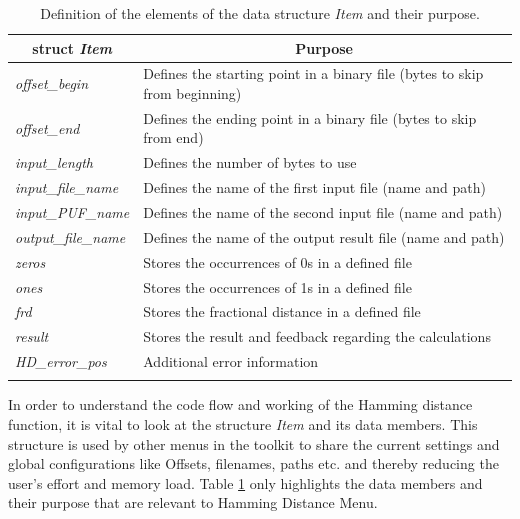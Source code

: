 \begin{table}[t]
	\begin{center}
		\begin{tabular}{ll}
			\toprule
			\multicolumn{1}{c}{\textbf{struct \emph{Item}}} & \multicolumn{1}{c}{\textbf{Purpose}}\\
			\midrule
			\hline

			\emph{offset\_begin} & Defines the starting point in a binary file (bytes to skip from beginning)\\

			\emph{offset\_end} & Defines the ending point in a binary file (bytes to skip from end)\\

			\emph{input\_length} & Defines the number of bytes to use \\

			\emph{input\_file\_name} & Defines the name of the first input file (name and path)\\

			\emph{input\_PUF\_name} & Defines the name of the second input file (name and path)\\

			\emph{output\_file\_name} & Defines the name of the output result file (name and path)\\

			\emph{zeros} & Stores the occurrences of 0s in a defined file\\

			\emph{ones} & Stores the occurrences of 1s in a defined file\\

			\emph{frd} & Stores the fractional distance in a defined file\\

			\emph{result} & Stores the result and feedback regarding the calculations\\

			\emph{HD\_error\_pos} & Additional error information \\

			\hline
			\addlinespace
			\bottomrule
		\end{tabular}
	\end{center}
	\caption{Definition of the elements of the data structure \emph{Item} and their purpose.}
	\label{table:item}
\end{table}

In order to understand the code flow and working of the Hamming distance function, it is vital to look at the structure \emph{Item} and its data members. This structure is used by other menus in the toolkit to share the current settings and global configurations like Offsets, filenames, paths etc. and thereby reducing the user's effort and memory load. Table \ref{table:item} only highlights the data members and their purpose that are relevant to Hamming Distance Menu.\\

